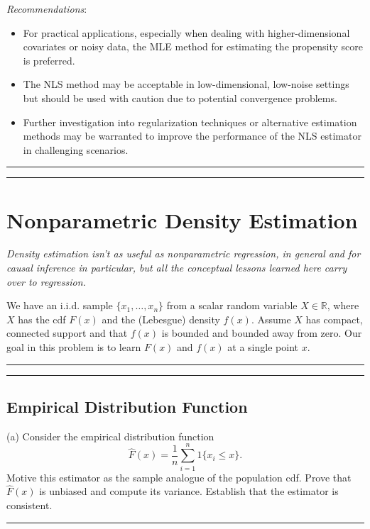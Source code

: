 \documentclass{article}
\newenvironment{colorparagraph}[1]{\par\color{#1}}{\par}
\begin{document}
\textit{Recommendations}:

\begin{itemize}
    \item For practical applications, especially when dealing with higher-dimensional covariates or noisy data, the MLE method for estimating the propensity score is preferred.
    \item The NLS method may be acceptable in low-dimensional, low-noise settings but should be used with caution due to potential convergence problems.
    \item Further investigation into regularization techniques or alternative estimation methods may be warranted to improve the performance of the NLS estimator in challenging scenarios.
\end{itemize}

\begin{colorparagraph}{questioncolor}

\rule{\textwidth}{0.5pt}
\label{q2}
\rule{\textwidth}{0.5pt}
\section{Nonparametric Density Estimation}

\textit{Density estimation isn't as useful as nonparametric regression, in general and for causal inference in particular, but all the conceptual lessons learned here carry over to regression.}

We have an i.i.d. sample \(\{x_1, \dots, x_n\}\) from a scalar random variable \( X \in \mathbb{R} \), where \( X \) has the cdf \( F(x) \) and the (Lebesgue) density \( f(x) \). Assume \( X \) has compact, connected support and that \( f(x) \) is bounded and bounded away from zero. Our goal in this problem is to learn \( F(x) \) and \( f(x) \) at a single point \( x \).

\rule{\textwidth}{0.5pt}
\end{colorparagraph}

\begin{colorparagraph}{questioncolor}
\label{q2a}
\rule{\textwidth}{0.5pt}
\subsection{Empirical Distribution Function}
(a) Consider the empirical distribution function
\[
\hat{F}(x) = \frac{1}{n} \sum_{i=1}^n 1\{x_i \leq x\}.
\]
Motive this estimator as the sample analogue of the population cdf. Prove that \( \hat{F}(x) \) is unbiased and compute its variance. Establish that the estimator is consistent.

\rule{\textwidth}{0.5pt}
\end{colorparagraph}
\end{document}
